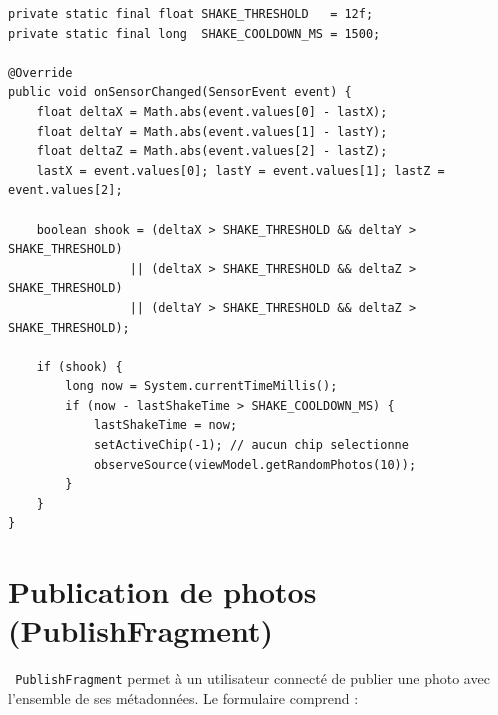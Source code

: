 \documentclass[a4paper,12pt,openany]{report}
\newcommand{\ic}[1]{\texttt{\small\colorbox{lightbg}{\color{navy!90} #1}}}
\begin{document}
\begin{lstlisting}
private static final float SHAKE_THRESHOLD   = 12f;
private static final long  SHAKE_COOLDOWN_MS = 1500;

@Override
public void onSensorChanged(SensorEvent event) {
    float deltaX = Math.abs(event.values[0] - lastX);
    float deltaY = Math.abs(event.values[1] - lastY);
    float deltaZ = Math.abs(event.values[2] - lastZ);
    lastX = event.values[0]; lastY = event.values[1]; lastZ = event.values[2];

    boolean shook = (deltaX > SHAKE_THRESHOLD && deltaY > SHAKE_THRESHOLD)
                 || (deltaX > SHAKE_THRESHOLD && deltaZ > SHAKE_THRESHOLD)
                 || (deltaY > SHAKE_THRESHOLD && deltaZ > SHAKE_THRESHOLD);

    if (shook) {
        long now = System.currentTimeMillis();
        if (now - lastShakeTime > SHAKE_COOLDOWN_MS) {
            lastShakeTime = now;
            setActiveChip(-1); // aucun chip selectionne
            observeSource(viewModel.getRandomPhotos(10));
        }
    }
}
\end{lstlisting}

\section{Publication de photos (PublishFragment)}

\ic{PublishFragment} permet à un utilisateur connecté de publier une photo avec
l'ensemble de ses métadonnées. Le formulaire comprend :
\end{document}

